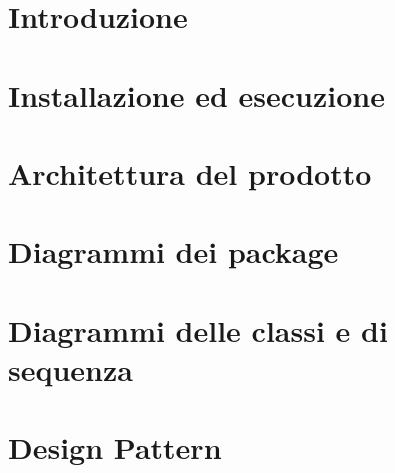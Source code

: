 \documentclass[a4paper, oneside, openany, dvipsnames, table]{article}
\begin{document}
\copertina{} 

\newpage
\tableofcontents
\newpage
\listoffigures
\newpage
\listoftables
\newpage

\section{Introduzione}

\newpage
\section{Installazione ed esecuzione}

\newpage
\section{Architettura del prodotto}

\newpage
\section{Diagrammi dei package}

\newpage
\section{Diagrammi delle classi e di sequenza}

\newpage
\section{Design Pattern}

\end{document}
